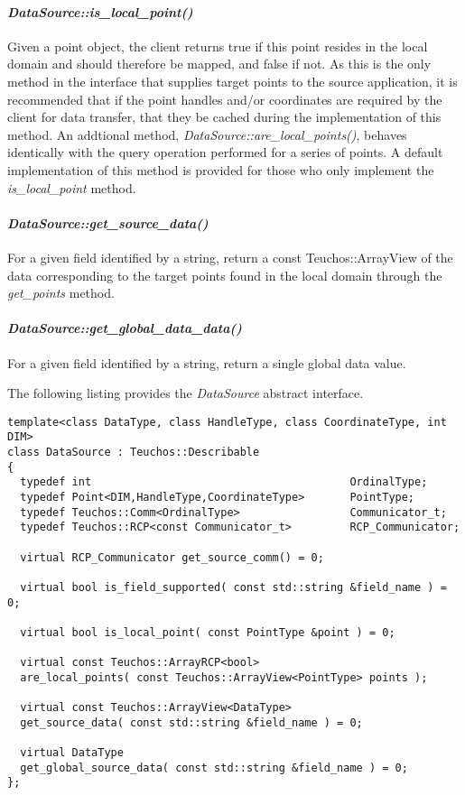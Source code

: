 \documentclass[letterpaper]{article}
\begin{document}
\paragraph{\sl DataSource::is\_local\_point()}
Given a point object, the client returns true if this point resides in
the local domain and should therefore be mapped, and false if not. As
this is the only method in the interface that supplies target points
to the source application, it is recommended that if the point handles
and/or coordinates are required by the client for data transfer, that
they be cached during the implementation of this method. An addtional
method, {\sl DataSource::are\_local\_points()}, behaves identically
with the query operation performed for a series of points. A default
implementation of this method is provided for those who only implement
the {\sl is\_local\_point} method.

\paragraph{\sl DataSource::get\_source\_data()}
For a given field identified by a string, return a const
Teuchos::ArrayView of the data corresponding to the target points
found in the local domain through the {\sl get\_points} method.

\paragraph{\sl DataSource::get\_global\_data\_data()}
For a given field identified by a string, return a single global data
value.

The following listing provides the {\sl DataSource} abstract
interface. 

\begin{lstlisting}
template<class DataType, class HandleType, class CoordinateType, int DIM>
class DataSource : Teuchos::Describable
{
  typedef int                                        OrdinalType;
  typedef Point<DIM,HandleType,CoordinateType>       PointType;
  typedef Teuchos::Comm<OrdinalType>                 Communicator_t;
  typedef Teuchos::RCP<const Communicator_t>         RCP_Communicator;

  virtual RCP_Communicator get_source_comm() = 0;

  virtual bool is_field_supported( const std::string &field_name ) = 0;

  virtual bool is_local_point( const PointType &point ) = 0;

  virtual const Teuchos::ArrayRCP<bool> 
  are_local_points( const Teuchos::ArrayView<PointType> points );

  virtual const Teuchos::ArrayView<DataType> 
  get_source_data( const std::string &field_name ) = 0;

  virtual DataType 
  get_global_source_data( const std::string &field_name ) = 0;
};
\end{lstlisting}
\end{document}
